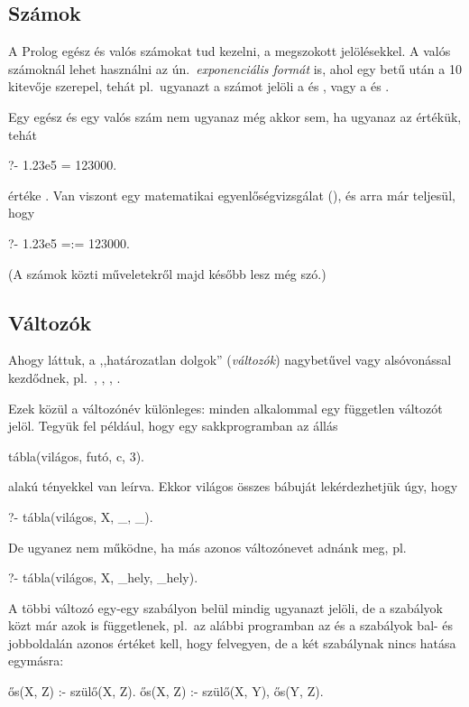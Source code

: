 \subsection*{Számok}
A Prolog egész és valós számokat tud kezelni, a
megszokott jelölésekkel. A valós számoknál lehet
használni az ún.~\emph{exponenciális formát} is,
ahol egy  betű után a 10 kitevője szerepel,
tehát pl.~ugyanazt a számot jelöli a  és
, vagy a  és .

Egy egész és egy valós szám nem ugyanaz még akkor
sem, ha ugyanaz az értékük, tehát
\begin{query}
?- 1.23e5 = 123000.
\end{query}
értéke . Van viszont egy matematikai
egyenlőségvizsgálat (\pr{=:=}), és arra már
teljesül, hogy
\begin{query}
?- 1.23e5 =:= 123000.
\end{query}
(A számok közti műveletekről majd később lesz még
szó.)

\subsection*{Változók}
Ahogy láttuk, a ,,határozatlan dolgok''
(\emph{változók}) nagybetűvel vagy alsóvonással
kezdődnek, pl.~, \pr{\_}, , .

Ezek közül a \pr{\_} változónév különleges: minden
alkalommal egy független változót jelöl. Tegyük fel
például, hogy egy sakkprogramban az állás
\begin{query}
tábla(világos, futó, c, 3).
\end{query}
alakú tényekkel van leírva. Ekkor világos összes
bábuját lekérdezhetjük úgy, hogy
\begin{query}
?- tábla(világos, X, _, _).
\end{query}
De ugyanez nem működne, ha más azonos változónevet
adnánk meg, pl.
\begin{query}
?- tábla(világos, X, _hely, _hely).
\end{query}

A többi változó egy-egy szabályon belül mindig
ugyanazt jelöli, de a szabályok közt már azok is
függetlenek, pl.~az alábbi programban az  és
 a szabályok bal- és jobboldalán azonos
értéket kell, hogy felvegyen, de a két szabálynak
nincs hatása egymásra:
\begin{program}
ős(X, Z) :- szülő(X, Z).
ős(X, Z) :- szülő(X, Y), ős(Y, Z).
\end{program}

